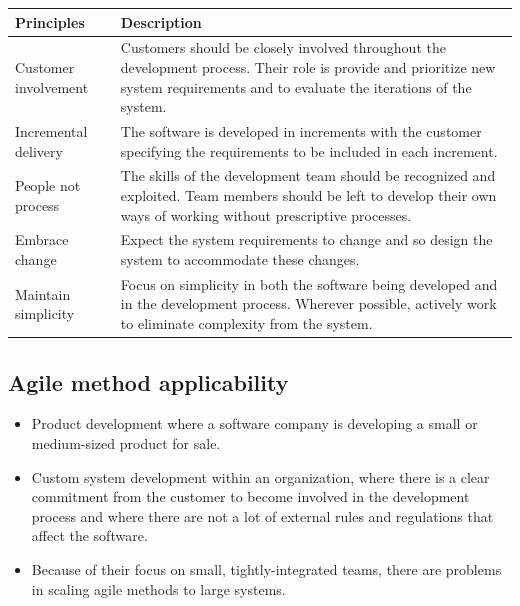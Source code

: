 \begin{table}[h!]
\centering
\begin{tabular}{ |p{3cm}|p{8cm}|  }
\hline
Principles & Description  \\
\hline
Customer involvement & Customers should be closely involved throughout the development process. Their role is provide and prioritize new system requirements and to evaluate the iterations of the system.\\
\hline

Incremental delivery & The software is developed in increments with the customer specifying the requirements to be included in each increment.\\
\hline
People not process & The skills of the development team should be recognized and exploited. Team members should be left to develop their own ways of working without prescriptive processes.\\
\hline
Embrace change & Expect the system requirements to change and so design the system to accommodate these changes.\\
\hline
Maintain simplicity & Focus on simplicity in both the software being developed and in the development process. Wherever possible, actively work to eliminate complexity from the system.\\
\hline
\end{tabular}

\label{table:T1_2}
\end{table}


 \subsection{ Agile method applicability}

 \begin{itemize}
\item Product development where a software company is developing a small or medium-sized product for sale.

\item Custom system development within an organization, where there is a clear commitment from the customer to become involved in the development process and where there are not a lot of external rules and regulations that affect the software.

\item Because of their focus on small, tightly-integrated teams, there are problems in scaling agile methods to large systems.

\end{itemize}
